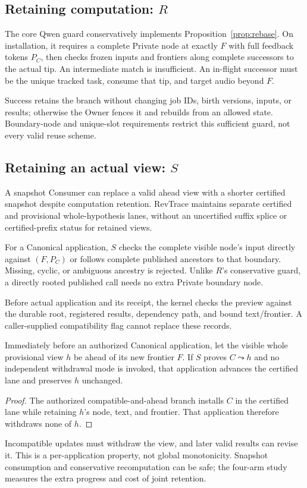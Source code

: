 \subsection{Retaining computation: \texorpdfstring{$R$}{R}}
The core Qwen guard conservatively implements Proposition~\ref{prop:rebase}.
On installation, it requires a complete Private node at exactly $F$ with
full feedback tokens $P_C$, then checks frozen inputs and frontiers along
complete successors to the actual tip. An intermediate match is insufficient.
An in-flight successor must be the unique tracked task, consume that tip,
and target audio beyond $F$.

Success retains the branch without changing job IDs, birth versions,
inputs, or results; otherwise the Owner fences it and rebuilds from an
allowed state. Boundary-node and unique-slot requirements restrict this
sufficient guard, not every valid reuse scheme.

\subsection{Retaining an actual view: \texorpdfstring{$S$}{S}}
A snapshot Consumer can replace a valid ahead view with a shorter
certified snapshot despite computation retention. RevTrace maintains
separate certified and provisional whole-hypothesis lanes, without an
uncertified suffix splice or certified-prefix status for retained views.

For a Canonical application, $S$ checks the complete visible node's input
directly against $(F,P_C)$ or follows complete published ancestors to
that boundary. Missing, cyclic, or ambiguous ancestry is rejected. Unlike
$R$'s conservative guard, a directly rooted published call needs no extra
Private boundary node.

Before actual application and its receipt, the kernel checks the preview
against the durable root, registered results, dependency path, and bound
text/frontier. A caller-supplied compatibility flag cannot replace these
records.

\begin{proposition}
\label{prop:continuity}
Immediately before an authorized Canonical application, let the visible
whole provisional view $h$ be ahead of its new frontier $F$. If $S$ proves
$C\leadsto h$ and no independent withdrawal mode is invoked, that
application advances the certified lane and preserves $h$ unchanged.
\end{proposition}
\begin{proof}
The authorized compatible-and-ahead branch installs $C$ in the certified
lane while retaining $h$'s node, text, and frontier. That application
therefore withdraws none of $h$.
\end{proof}

Incompatible updates must withdraw the view, and later valid results can
revise it. This is a per-application property, not global monotonicity.
Snapshot consumption and conservative recomputation can be safe; the
four-arm study measures the extra progress and cost of joint retention.
